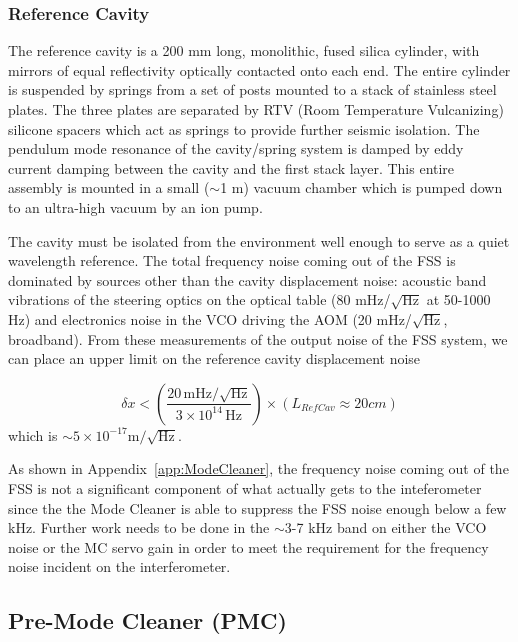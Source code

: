 \subsubsection{Reference Cavity}

The reference cavity is a 200 mm long, monolithic, fused silica cylinder, 
with mirrors of equal reflectivity optically contacted onto each end. 
The entire cylinder is suspended
by springs from a set of posts mounted to a stack of stainless steel plates.
The three plates are separated by RTV (Room Temperature Vulcanizing) silicone
spacers which act as springs to provide further seismic
isolation. The pendulum mode resonance of the cavity/spring system is 
damped by eddy current damping between the cavity and the first stack layer.
This entire assembly is mounted in a small ($\sim$1 m) vacuum chamber which is
pumped down to an ultra-high vacuum by an ion pump.

The cavity must be isolated from the environment well enough to serve as a quiet
wavelength reference. The total frequency noise coming out of the FSS is 
dominated by sources other than the cavity displacement noise: acoustic band 
vibrations of the steering optics on the
optical table (80 mHz/$\sqrt{\mbox{Hz}}$ at 50-1000 Hz) and electronics noise in the 
VCO driving the AOM (20 mHz/$\sqrt{\mbox{Hz}}$, broadband). From these measurements of the
output noise of the FSS system, we can place an upper limit on the reference
cavity displacement noise 

\begin{equation}
\delta x  <  \left(\frac{20 \, \mbox{mHz}/\sqrt{\mbox{Hz}}}
                   {3 \times 10^{14} \, \mbox{Hz}} \right)
                   \times \left(L_{RefCav} \approx 20 cm \right)
\end{equation}
which is $\sim5 \times 10^{-17} \mbox{m}/\sqrt{\mbox{Hz}}$.

As shown in Appendix~\ref{app:ModeCleaner}, the frequency noise coming
out of the FSS is not a significant component of what actually gets
to the inteferometer since the the Mode Cleaner is able to suppress the
FSS noise enough below a few kHz. Further work needs to be done in the
$\sim$3-7 kHz band on either the VCO noise or the MC servo gain in order
to meet the requirement for the frequency noise incident on the interferometer.


\subsection{Pre-Mode Cleaner (PMC)}

